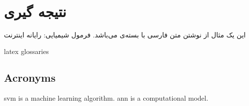\chapter{نتیجه گیری}

\clearpage

این یک مثال از نوشتن متن فارسی با بسته‌ی  می‌باشد.
فرمول شیمیایی: 
\gls{رایانه}
\gls{اینترنت}
\begin{latin}
\gls{latex}
\gls{glossaries}
\section{Acronyms}
        \gls{svm} is a machine learning algorithm.
        \gls{ann} is a computational model.

\end{latin}

